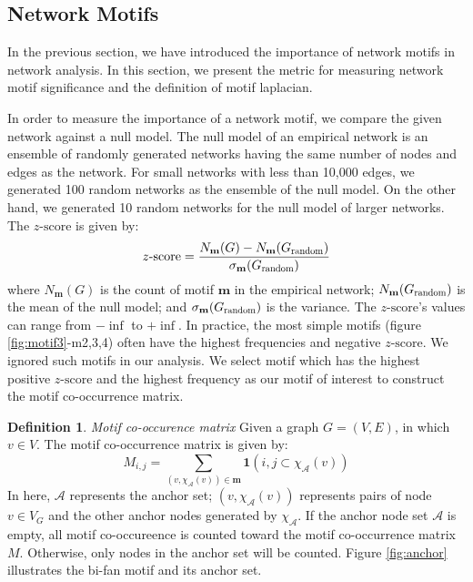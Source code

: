 \documentclass{article}
\theoremstyle{definition}
\newtheorem{definition}{Definition}[section]
\begin{document}
\subsection{Network Motifs}

In the previous section, we have introduced the importance of
network motifs in network analysis. In this section, we present
the metric for measuring network motif significance and the definition
of motif laplacian.

In order to measure the importance of a network motif, we compare
the given network against a null model. The null model of an empirical network 
is an ensemble of randomly generated networks having the same number of nodes and
edges as the network. For small networks with less than 10,000 edges, we
generated 100 random networks as the ensemble of the null model. On the other
hand, we generated 10 random networks for the null model of larger networks.
The $z\mbox{-score}$ is given by:
\begin{equation*}
z\mbox{-score} = \frac{N_\mathbf{m}(G)-N_\mathbf{m}(G_{\scalebox{0.75}{random}})}{\sigma_\mathbf{m}(G_{\scalebox{0.75}{random}})}
\end{equation*}
where $N_\mathbf{m}(G)$ is the count of motif $\mathbf{m}$ in the empirical
network; $N_\mathbf{m}(G_{\scalebox{0.75}{random}})$ is the mean of the
null model; and $\sigma_\mathbf{m}(G_{\scalebox{0.75}{random}})$ is the variance.
The $z\mbox{-score}$'s values can range from $-\inf$ to $+\inf$. In practice,
the most simple motifs (figure \ref{fig:motif3}-m2,3,4) often have the highest
frequencies and negative $z\mbox{-score}$. We ignored such motifs in our analysis.
We select motif which has the highest positive $z\mbox{-score}$ and the highest frequency
as our motif of interest to construct the motif co-occurrence matrix.

\begin{definition} \emph{Motif co-occurence matrix}
Given a graph $G = (V,E)$, in which $v \in V$. The motif co-occurrence matrix
is given by:
$$M_{i,j} = \sum_{(v, \chi_{\mathcal{A}}(v)) \in \mathbf{m}} \mathbf{1}({i,j} \subset \chi_\mathcal{A}(v))$$
In here, $\mathcal{A}$ represents the anchor set; $(v, \chi_{\mathcal{A}}(v))$ 
represents pairs of node $v \in V_G$ and the other anchor nodes generated by $\chi_\mathcal{A}$.
If the anchor node set $\mathcal{A}$ is empty, all motif co-occureence is
counted toward the motif co-occurrence matrix $M$. Otherwise, only nodes in
the anchor set will be counted. Figure \ref{fig:anchor} illustrates
the bi-fan motif and its anchor set.
\end{definition}
\end{document}
